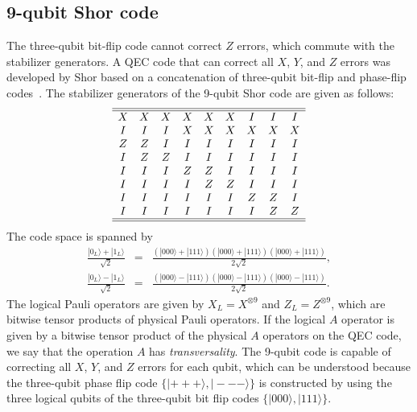 \subsection*{9-qubit Shor code}
The three-qubit bit-flip code cannot correct $Z$ errors, which commute with the stabilizer generators.
A QEC code that can correct all $X$, $Y$, and $Z$ errors was developed by Shor based on a concatenation of three-qubit bit-flip and phase-flip codes~\cite{Shor95}.
The stabilizer generators of the 9-qubit Shor code are given as follows:
%
\begin{equation}
\begin{array}{ccccccccc}
\hline \hline
X & X & X& X& X& X & I & I & I
\\
I&I&I&X&X&X&X&X&X
\\
Z&Z&I&I&I&I&I&I&I
\\
I&Z&Z&I&I&I&I&I&I
\\
I & I & I & Z & Z & I & I & I & I
\\
I&I&I&I&Z&Z&I&I&I
\\
I&I&I&I&I&I&Z&Z&I
\\
I&I&I&I&I&I&I&Z&Z
\\
\hline \hline
\end{array}
\end{equation}
%
The code space is spanned by
%
\begin{eqnarray}
\frac{|0 _{L}\rangle + |1_{L} \rangle}{\sqrt{2}}
&=& 
\frac{\left(|000\rangle + |111 \rangle \right) \left(|000\rangle + |111 \rangle \right) \left(|000\rangle + |111 \rangle\right)}{2\sqrt{2}} ,  
\\
\frac{|0 _{L}\rangle - |1_{L} \rangle}{\sqrt{2}}
&=& 
\frac{\left(|000\rangle -|111 \rangle \right) \left(|000\rangle -|111 \rangle \right) \left(|000\rangle -|111 \rangle\right)}{2\sqrt{2}}.
\end{eqnarray}
%
The logical Pauli operators are given by $X_{L}=X^{\otimes 9}$ and $Z_{L}=Z^{\otimes 9}$, which are bitwise tensor products of physical Pauli operators.
If the logical $A$ operator is given by a bitwise tensor product of the physical $A$ operators on the QEC code, we say that the operation $A$ has {\it transversality}.
The 9-qubit code is capable of correcting all $X$, $Y$, and $Z$ errors for each qubit, which can be understood because the three-qubit phase flip code 
$\{ |+++\rangle , |---\rangle \}$ is constructed by using the three logical qubits of the three-qubit bit flip codes $\{ |000\rangle, |111\rangle \}$.

